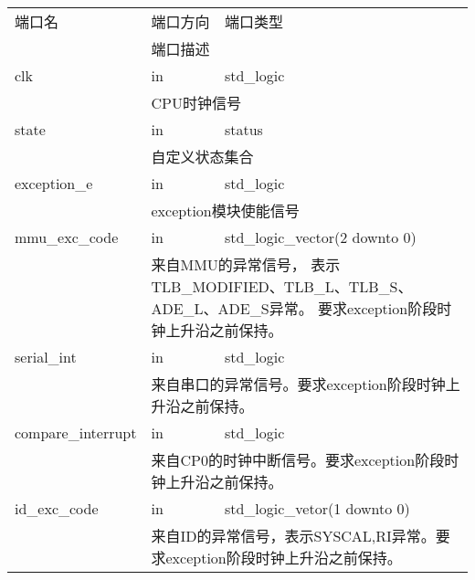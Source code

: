         \begin{tabularx}{\textwidth}{lll}
            \toprule
            端口名          & 端口方向  & 端口类型 \\
            \cmidrule(l){2-3}
            &
            \multicolumn{2}{X}{端口描述} \\
            \midrule
            clk             & in        & std\_logic \\
            \cmidrule(l){2-3}
            &
            \multicolumn{2}{X}{
                CPU时钟信号
            } \\
            \midrule
            state           & in        & status \\
            \cmidrule(l){2-3}
            &
            \multicolumn{2}{X}{
                自定义状态集合
            } \\
            \midrule
            exception\_e    & in        & std\_logic \\
            \cmidrule(l){2-3}
            &
            \multicolumn{2}{X}{
                exception模块使能信号
            } \\
            \midrule
            mmu\_exc\_code  & in        & std\_logic\_vector(2 downto 0) \\
            \cmidrule(l){2-3}
            &
            \multicolumn{2}{X}{
                来自MMU的异常信号，%
                表示TLB\_MODIFIED、TLB\_L、TLB\_S、ADE\_L、ADE\_S异常。%
                要求exception阶段时钟上升沿之前保持。
            } \\
            \midrule
            serial\_int     & in        & std\_logic \\
            \cmidrule(l){2-3}
            &
            \multicolumn{2}{X}{
                来自串口的异常信号。要求exception阶段时钟上升沿之前保持。
            } \\
            \midrule
            compare\_interrupt & in     & std\_logic \\
            \cmidrule(l){2-3}
            &
            \multicolumn{2}{X}{
                来自CP0的时钟中断信号。要求exception阶段时钟上升沿之前保持。
            } \\
            \midrule
            id\_exc\_code   & in        & std\_logic\_vetor(1 downto 0) \\
            \cmidrule(l){2-3}
            &
            \multicolumn{2}{X}{
                来自ID的异常信号，表示SYSCAL,RI异常。要求exception阶段时钟上升沿之前保持。
            } \\

\end{tabularx}
